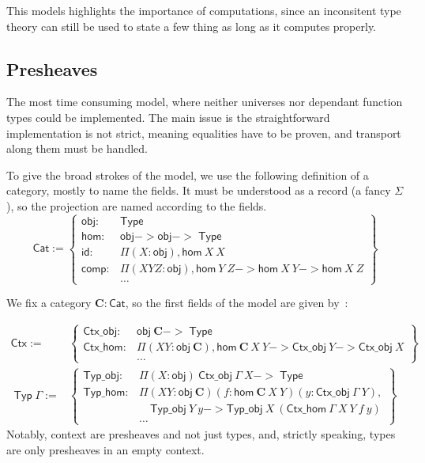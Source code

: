 \documentclass[11pt]{article}
\DeclareMathOperator{\Type}{\mathsf{Type}}
\DeclareMathOperator{\Typ}{\mathsf{Typ}}
\newcommand{\0}{\mathbf{0}}
\newcommand{\1}{\mathbf{1}}
\newcommand{\C}{\mathbf{C}}
\begin{document}
This models highlights the importance of computations, since an inconsitent type theory can still be used to state a few thing as long as it computes properly.

\subsection{Presheaves}

The most time consuming model, where neither universes nor dependant function types could be implemented. The main issue is the straightforward implementation is not strict, meaning equalities have to be proven, and transport along them must be handled.

To give the broad strokes of the model, we use the following definition of a category, mostly to name the fields. It must be understood as a record (a fancy $\Sigma$), so the projection are named according to the fields.
$$ \textsf{Cat} := \left\{
    \begin{array}{rl}
        \mathsf{obj} :& \Type\\
        \mathsf{hom} :& \mathsf{obj}->\mathsf{obj}->\Type\\
        \mathsf{id} :& \Pi (X : \mathsf{obj}),\mathsf{hom}\ X\ X\\
        \mathsf{comp} :& \Pi (X Y Z: \mathsf{obj}), \mathsf{hom}\ Y\ Z -> \mathsf{hom}\ X\ Y -> \mathsf{hom}\ X\ Z \\
        &\dots
    \end{array} \right\}
$$

We fix a category $\mathbf{C} : \mathsf{Cat}$, so the first fields of the model are given by~:

$$
    \begin{array}{rl}
        \mathsf{Ctx} :=& 
        \left\{\begin{array}{rl}
            \mathsf{Ctx\_obj} :& \mathsf{obj}\ \C -> \Type\\
            \mathsf{Ctx\_hom} :& \Pi (X Y : \mathsf{obj}\ \C), \mathsf{hom}\ \C\ X\ Y -> \mathsf{Ctx\_obj}\ Y -> \mathsf{Ctx\_obj}\ X\\
            &\dots
        \end{array}\right\}\\
        \Typ\Gamma :=&
        \left\{\begin{array}{rl}
            \mathsf{Typ\_obj} :& \Pi (X : \mathsf{obj})\ \mathsf{Ctx\_obj}\ \Gamma\ X -> \Type\\
            \mathsf{Typ\_hom} :& \Pi (X Y : \mathsf{obj}\ \C)(f:\mathsf{hom}\ \C\ X\ Y)(y : \mathsf{Ctx\_obj}\ \Gamma\ Y),\\ 
            & \quad\mathsf{Typ\_obj}\ Y\ y -> \mathsf{Typ\_obj}\ X\ (\mathsf{Ctx\_hom}\ \Gamma\ X\ Y\ f\ y)\\
            &\dots
        \end{array}\right\}
    \end{array}
$$
Notably, context are presheaves and not just types, and, strictly speaking, types are only presheaves in an empty context.
\end{document}
